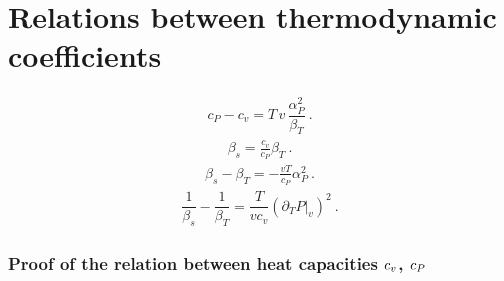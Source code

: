 \documentclass[letterpaper,10pt,english]{jupyterBook}
\begin{document}
\section{Relations between thermodynamic coefficients}
\label{\detokenize{ch/coefficients:relations-between-thermodynamic-coefficients}}
\sphinxAtStartPar
{}
\begin{equation}\label{equation:ch/coefficients:eq:cv-cp}
\begin{split}c_P - c_v = T \, v \, \dfrac{\alpha_P^2}{\beta_T} \ . \end{split}
\end{equation}
\sphinxAtStartPar
{}
\begin{equation}\label{equation:ch/coefficients:eq:beta-1}
\begin{split}\beta_s = \frac{c_v}{c_P} \beta_T \ .\end{split}
\end{equation}
\sphinxAtStartPar
{}
\begin{equation}\label{equation:ch/coefficients:eq:beta-2}
\begin{split}\beta_s - \beta_T = - \frac{v T}{c_P} \alpha_P^2 \ .\end{split}
\end{equation}
\sphinxAtStartPar
{}
\begin{equation}\label{equation:ch/coefficients:eq:beta-3}
\begin{split}\dfrac{1}{\beta_s} - \dfrac{1}{\beta_T} = \dfrac{T}{v c_v} \left( \partial_T P|_v \right)^2 \ .\end{split}
\end{equation}\subsubsection*{Proof of the relation between heat capacities \protect\(c_v\protect\), \protect\(c_P\protect\)}
\end{document}

